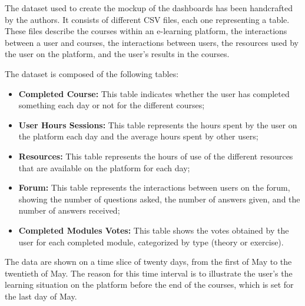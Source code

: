 The dataset used to create the mockup of the dashboards has been handcrafted by the authors.
It consists of different CSV files, each one representing a table. These files describe
the courses within an e-learning platform, the interactions between a user and courses,
the interactions between users, the resources used by the user on the platform, and the user's
results in the courses.

The dataset is composed of the following tables:
\begin{itemize}
    \item 
        \textbf{Completed Course:} This table indicates whether the user has completed something each 
        day or not for the different courses;
    \item 
        \textbf{User Hours Sessions:} This table represents the hours spent by the user on the platform 
        each day and the average hours spent by other users;
    \item 
        \textbf{Resources:} This table represents the hours of use of the different resources that are
        available on the platform for each day;
    \item 
        \textbf{Forum:} This table represents the interactions between users on the forum, showing the number
        of questions asked, the number of answers given, and the number of answers received;
    \item 
        \textbf{Completed Modules Votes:} This table shows the votes obtained by the user for each completed module, 
        categorized by type (theory or exercise).
\end{itemize}

The data are shown on a time slice of twenty days, from the first of May to the twentieth of May. The reason for 
this time interval is to illustrate the user's the learning situation on the platform before the end of the courses,
which is set for the last day of May. 

